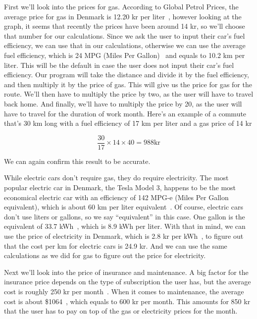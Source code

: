 First we'll look into the prices for gas.
According to Global Petrol Prices, the average price for gas in Denmark is 12.20 kr per liter~\cite{price_gas}, however
looking at the graph, it seems that recently the prices have been around 14 kr, so we'll choose that number for our
calculations.
Since we ask the user to input their car's fuel efficiency, we can use that in our calculations, otherwise we can use
the average fuel efficiency, which is 24 MPG (Miles Per Gallon)~\cite{price_mpg} and equals to 10.2 km per liter.
This will be the default in case the user does not input their car's fuel efficiency.
Our program will take the distance and divide it by the fuel efficiency, and then multiply it by the price of gas.
This will give us the price for gas for the route.
We'll then have to multiply the price by two, as the user will have to travel back home.
And finally, we'll have to multiply the price by 20, as the user will have to travel for the duration of work month.
Here's an example of a commute that's 30 km long with a fuel efficiency of 17 km per liter and a gas price of 14 kr

\begin{equation}
    \frac{30}{17} \times 14 \times 40 = 988 \text{kr}
\end{equation}

We can again confirm this result to be accurate.

While electric cars don't require gas, they do require electricity.
The most popular electric car in Denmark, the Tesla Model 3, happens to be the most economical electric car with an
efficiency of 142 MPG-e (Miles Per Gallon equivalent), which is about 60 km per liter equivalent~\cite{price_el}.
Of course, electric cars don't use liters or gallons, so we say ``equivalent'' in this case.
One gallon is the equivalent of 33.7 kWh~\cite{price_mpge}, which is 8.9 kWh per liter.
With that in mind, we can use the price of electricity in Denmark, which is 2.8 kr per kWh~\cite{price_energy}, to
figure out that the cost per km for electric cars is 24.9 kr.
And we can use the same calculations as we did for gas to figure out the price for electricity.

Next we'll look into the price of insurance and maintenance.
A big factor for the insurance price depends on the type of subscription the user has, but the average cost is roughly
250 kr per month~\cite{price_insurance}.
When it comes to maintenance, the average cost is about \$1064~\cite{price_repair}, which equals to 600 kr per month.
This amounts for 850 kr that the user has to pay on top of the gas or electricity prices for the month.

